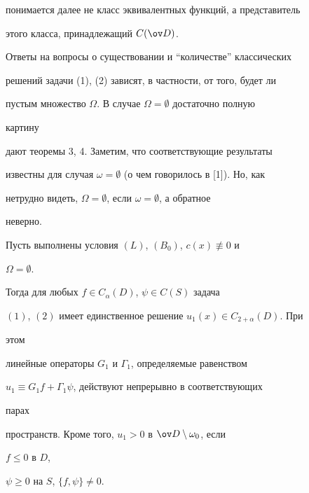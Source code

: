 понимается далее не класс эквивалентных функций, а представитель 


этого класса, принадлежащий $C(\ov D)$. 


 


Ответы на вопросы о существовании и ``количестве'' классических 


решений задачи (1), (2) зависят, в частности, от того, будет ли 


пустым множество $\Omega$. В случае $\Omega=\emptyset$ достаточно полную 


картину 


дают теоремы 3, 4. Заметим, что соответствующие результаты 


известны для случая $\omega=\emptyset$ (о чем говорилось в [1]). Но, как 


нетрудно видеть, $\Omega=\emptyset$, если $\omega=\emptyset$, а обратное 


неверно. 


 


\begin{thm} 


Пусть выполнены условия $(L)$, $(B_0)$, $c(x)\not\equiv0$ и 


$\Omega=\emptyset$. 


Тогда для любых $f\in C_\alpha(D)$, $\psi\in C(S)$ задача 


$(1)$, $(2)$ имеет единственное решение $u_1(x)\in C_{2+\alpha}(D)$. При 


этом 


линейные операторы $G_1$ и $\Gamma_1$, определяемые равенством 


$u_1\equiv G_1f+\Gamma_1\psi$, действуют непрерывно в соответствующих 


парах 


пространств. Кроме того, $u_1>0$ в $\ov D\setminus\omega_0$, если 


$f\le0$ в $D$, 


$\psi\ge0$ на $S$, $\{f,\psi\}\ne0$. 


\end{thm} 


 


